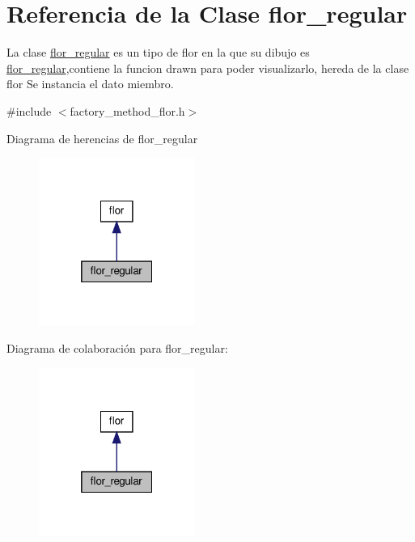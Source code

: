 \hypertarget{classflor__regular}{}\section{Referencia de la Clase flor\+\_\+regular}
\label{classflor__regular}


La clase \hyperlink{classflor__regular}{flor\+\_\+regular} es un tipo de flor en la que su dibujo es \hyperlink{classflor__regular}{flor\+\_\+regular},contiene la funcion drawn para poder visualizarlo, hereda de la clase flor  Se instancia el dato miembro.  




{\ttfamily \#include $<$factory\+\_\+method\+\_\+flor.\+h$>$}



Diagrama de herencias de flor\+\_\+regular
\nopagebreak
\begin{figure}[H]
\begin{center}
\leavevmode
\includegraphics[width=145pt]{classflor__regular__inherit__graph}
\end{center}
\end{figure}


Diagrama de colaboración para flor\+\_\+regular\+:
\nopagebreak
\begin{figure}[H]
\begin{center}
\leavevmode
\includegraphics[width=145pt]{classflor__regular__coll__graph}
\end{center}
\end{figure}
